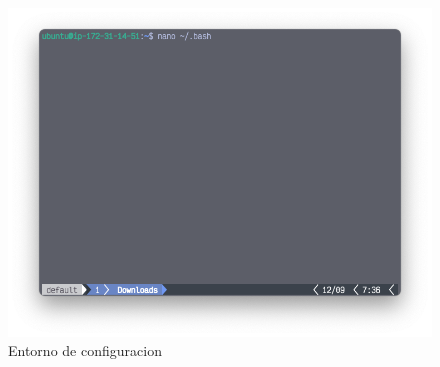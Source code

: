  \begin{figure}[h]
	\centering
	\includegraphics[scale=.35] {img/22-editBashRc}
	\caption{Entorno de configuracion}
	\label{fig:22}	
\end{figure}

